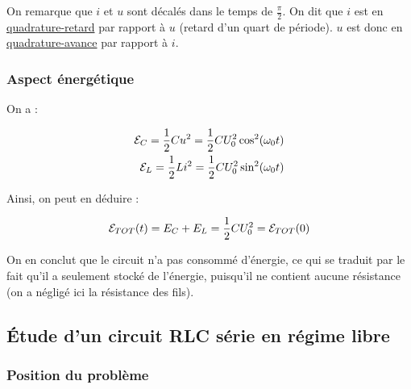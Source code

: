 \documentclass{article}
\begin{document}
On remarque que $i$ et $u$ sont décalés dans le temps de $\frac{\pi}{2}$. On dit que $i$ est en \underline{quadrature-retard} par rapport à $u$ (retard d'un quart de période). $u$ est donc en \underline{quadrature-avance} par rapport à $i$.


\subsubsection{Aspect énergétique}

On a :

\begin{align*}\begin{split}
\mathcal{E}_C=\frac{1}{2}Cu^2=\frac{1}{2}CU_0^2\cos^2(\omega_0t)\\
\mathcal{E}_L=\frac{1}{2}Li^2=\frac{1}{2}CU_0^2\sin^2(\omega_0t)\\
\end{split}\end{align*}

Ainsi, on peut en déduire :

\begin{align*}\begin{split}
\mathcal{E}_{TOT}(t)=E_C+E_L=\frac{1}{2}CU_0^2=\mathcal{E}_{TOT}(0)
\end{split}\end{align*}

On en conclut que le circuit n'a pas consommé d'énergie, ce qui se traduit par le fait qu'il a seulement stocké de l'énergie, puisqu'il ne contient aucune résistance (on a négligé ici la résistance des fils).

\subsection{Étude d'un circuit RLC série en régime libre}


\subsubsection{Position du problème}
\end{document}
